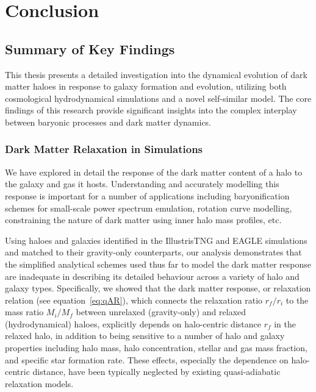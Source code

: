 \chapter{Conclusion}
\label{chap:conclusion}



\section{Summary of Key Findings}

This thesis presents a detailed investigation into the dynamical evolution of dark matter haloes in response to galaxy formation and evolution, utilizing both cosmological hydrodynamical simulations and a novel self-similar model. The core findings of this research provide significant insights into the complex interplay between baryonic processes and dark matter dynamics.

\subsection{Dark Matter Relaxation in Simulations}
We have explored in detail the response of the dark matter content of a halo to the galaxy and gas it hosts. Understanding and accurately modelling this response is important for a number of applications including baryonification schemes for small-scale power spectrum emulation, rotation curve modelling, %
constraining the nature of dark matter using inner halo mass profiles, etc. 

Using haloes and galaxies identified in the IllustrisTNG and EAGLE simulations and matched to their gravity-only counterparts, our analysis demonstrates that the simplified analytical schemes used thus far to model the dark matter response \citep[e.g.,][]{1986ApJ...301...27B,2010MNRAS.407..435A,2015JCAP...12..049S} are inadequate in describing its detailed behaviour across a variety of halo and galaxy types. Specifically, we showed that the dark matter response, or relaxation relation (see equation~\ref{eq:qAR}), which connects the relaxation ratio $r_f/r_i$ to the mass ratio $M_i/M_f$ between unrelaxed (gravity-only) and relaxed (hydrodynamical) haloes, explicitly depends on halo-centric distance $r_f$ in the relaxed halo, in addition to being sensitive to a number of halo and galaxy properties including halo mass, halo concentration, stellar and gas mass fraction, and specific star formation rate. These effects, especially the dependence on halo-centric distance, have been typically neglected by existing quasi-adiabatic relaxation models. 

